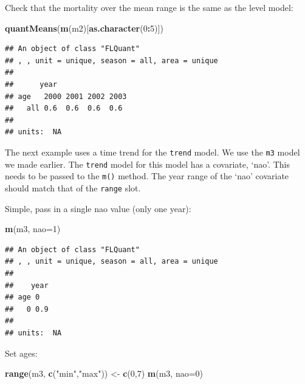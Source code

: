 \documentclass[
]{book}
\newenvironment{Shaded}{\begin{snugshade}}{\end{snugshade}}
\newcommand{\AttributeTok}[1]{\textcolor[rgb]{0.13,0.29,0.53}{#1}}
\newcommand{\DecValTok}[1]{\textcolor[rgb]{0.00,0.00,0.81}{#1}}
\newcommand{\FunctionTok}[1]{\textcolor[rgb]{0.13,0.29,0.53}{\textbf{#1}}}
\newcommand{\NormalTok}[1]{#1}
\newcommand{\OtherTok}[1]{\textcolor[rgb]{0.56,0.35,0.01}{#1}}
\newcommand{\SpecialCharTok}[1]{\textcolor[rgb]{0.81,0.36,0.00}{\textbf{#1}}}
\newcommand{\StringTok}[1]{\textcolor[rgb]{0.31,0.60,0.02}{#1}}
\begin{document}
Check that the mortality over the mean range is the same as the level model:

\begin{Shaded}
\begin{Highlighting}[]
\FunctionTok{quantMeans}\NormalTok{(}\FunctionTok{m}\NormalTok{(m2)[}\FunctionTok{as.character}\NormalTok{(}\DecValTok{0}\SpecialCharTok{:}\DecValTok{5}\NormalTok{)])}
\end{Highlighting}
\end{Shaded}

\begin{verbatim}
## An object of class "FLQuant"
## , , unit = unique, season = all, area = unique
## 
##      year
## age   2000 2001 2002 2003
##   all 0.6  0.6  0.6  0.6 
## 
## units:  NA
\end{verbatim}

The next example uses a time trend for the \texttt{trend} model. We use the \texttt{m3} model we made earlier. The \texttt{trend} model for this model has a covariate, `nao'. This needs to be passed to the \texttt{m()} method. The year range of the `nao' covariate should match that of the \texttt{range} slot.

Simple, pass in a single nao value (only one year):

\begin{Shaded}
\begin{Highlighting}[]
\FunctionTok{m}\NormalTok{(m3, }\AttributeTok{nao=}\DecValTok{1}\NormalTok{)}
\end{Highlighting}
\end{Shaded}

\begin{verbatim}
## An object of class "FLQuant"
## , , unit = unique, season = all, area = unique
## 
##    year
## age 0  
##   0 0.9
## 
## units:  NA
\end{verbatim}

Set ages:

\begin{Shaded}
\begin{Highlighting}[]
\FunctionTok{range}\NormalTok{(m3, }\FunctionTok{c}\NormalTok{(}\StringTok{"min"}\NormalTok{,}\StringTok{"max"}\NormalTok{)) }\OtherTok{\textless{}{-}} \FunctionTok{c}\NormalTok{(}\DecValTok{0}\NormalTok{,}\DecValTok{7}\NormalTok{)}
\FunctionTok{m}\NormalTok{(m3, }\AttributeTok{nao=}\DecValTok{0}\NormalTok{)}
\end{Highlighting}
\end{Shaded}
\end{document}
